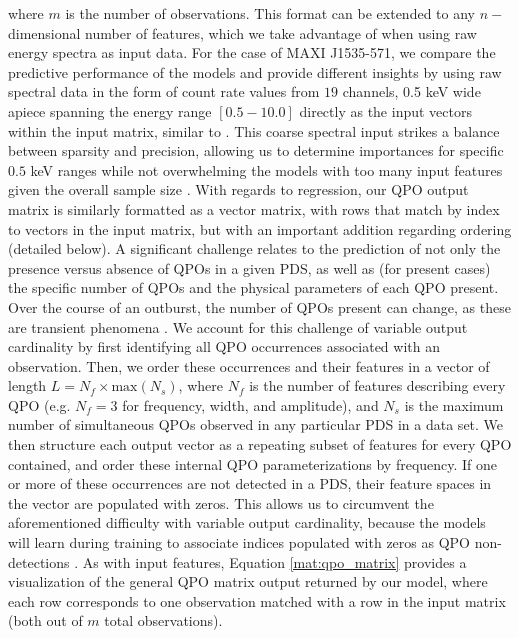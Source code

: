 \documentclass[fleqn,usenatbib,twocolumn]{mnras}%
\begin{document}
\noindent where $m$ is the number of observations. This format can be extended to any $n-$dimensional number of features, which we take advantage of when using raw energy spectra as input data. For the case of MAXI J1535-571, we compare the predictive performance of the models and provide different insights by using raw spectral data in the form of count rate values from $19$ channels, 0.5 keV wide apiece spanning the energy range $[0.5-10.0]$ directly as the input vectors within the input matrix, similar to \cite{Pattnaik2020}. This coarse spectral input strikes a balance between sparsity and precision, allowing us to determine importances for specific $0.5$ keV ranges while not overwhelming the models with too many input features given the overall sample size \citep{smallsample1991,van2020small}. With regards to regression, our QPO output matrix is similarly formatted as a vector matrix, with rows that match by index to vectors in the input matrix, but with an important addition regarding ordering (detailed below). A significant challenge relates to the prediction of not only the presence versus absence of QPOs in a given PDS, as well as (for present cases) the specific number of QPOs and the physical parameters of each QPO present. Over the course of an outburst, the number of QPOs present can change, as these are transient phenomena \citep{Remillard2006,ingram2019}. We account for this challenge of variable output cardinality by first identifying all QPO occurrences associated with an observation. Then, we order these occurrences and their features in a vector of length $L=N_f\times \mathrm{max}(N_s)$, where $N_f$ is the number of features describing every QPO (e.g. $N_f=3$ for frequency, width, and amplitude), and $N_s$ is the maximum number of simultaneous QPOs observed in any particular PDS in a data set. We then structure each output vector as a repeating subset of features for every QPO contained, and order these internal QPO parameterizations by frequency. If one or more of these occurrences are not detected in a PDS, their feature spaces in the vector are populated with zeros. This allows us to circumvent the aforementioned difficulty with variable output cardinality, because the models will learn during training to associate indices populated with zeros as QPO non-detections \citep{deepLearningPython}. As with input features, Equation \ref{mat:qpo_matrix} provides a visualization of the general QPO matrix output returned by our model, where each row corresponds to one observation matched with a row in the input matrix (both out of $m$ total observations). 
\end{document}
